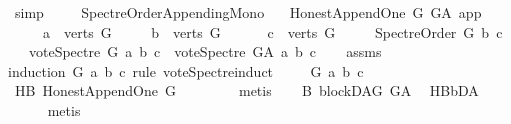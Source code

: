 \begin{isabellebody}
\ simp\ \isanewline
\ \ \isamarkupfalse%
\isanewline
{}\isamarkupfalse%
%
\endisatagproof
{\isafoldproof}%
%
\isadelimproof
\isanewline
%
\endisadelimproof
\isanewline
{}\isamarkupfalse%
\ Spectre{\isacharunderscore}{\kern0pt}Order{\isacharunderscore}{\kern0pt}Appending{\isacharunderscore}{\kern0pt}Mono{\isacharcolon}{\kern0pt}\isanewline
\ \ \ {\isachardoublequoteopen}Honest{\isacharunderscore}{\kern0pt}Append{\isacharunderscore}{\kern0pt}One\ G\ G{\isacharunderscore}{\kern0pt}A\ app{\isachardoublequoteclose}\isanewline
\ \ \ \ \ {\isachardoublequoteopen}a\ {\isasymin}\ verts\ G{\isachardoublequoteclose}\isanewline
\ \ \ \ \ {\isachardoublequoteopen}b\ {\isasymin}\ verts\ G{\isachardoublequoteclose}\ \isanewline
\ \ \ \ \ {\isachardoublequoteopen}c\ {\isasymin}\ verts\ G{\isachardoublequoteclose}\isanewline
\ \ \ \ \ {\isachardoublequoteopen}Spectre{\isacharunderscore}{\kern0pt}Order\ G\ b\ c{\isachardoublequoteclose}\isanewline
\ \ \ {\isachardoublequoteopen}vote{\isacharunderscore}{\kern0pt}Spectre\ G\ a\ b\ c\ {\isasymle}\ vote{\isacharunderscore}{\kern0pt}Spectre\ G{\isacharunderscore}{\kern0pt}A\ a\ b\ c{\isachardoublequoteclose}\isanewline
%
\isadelimproof
\ \ %
\endisadelimproof
%
\isatagproof
{}\isamarkupfalse%
\ assms\isanewline
{}\isamarkupfalse%
{\isacharparenleft}{\kern0pt}induction\ G\ a\ b\ c\ rule{\isacharcolon}{\kern0pt}\ vote{\isacharunderscore}{\kern0pt}Spectre{\isachardot}{\kern0pt}induct{\isacharparenright}{\kern0pt}\isanewline
\ \ \isamarkupfalse%
\ {\isacharparenleft}{\kern0pt}{}\ G\ a\ b\ c{\isacharparenright}{\kern0pt}\isanewline
\ \ \isamarkupfalse%
\ HB{}{\isacharcolon}{\kern0pt}\ Honest{\isacharunderscore}{\kern0pt}Append{\isacharunderscore}{\kern0pt}One\ {\isachardoublequoteopen}G{\isachardoublequoteclose}\ \isamarkupfalse%
\ {}{\isacharparenleft}{\kern0pt}{}{\isacharparenright}{\kern0pt}\isanewline
\ \ \ \ \isamarkupfalse%
\ metis\isanewline
\ \ \isamarkupfalse%
\ B{}{\isacharcolon}{\kern0pt}\ blockDAG\ {\isachardoublequoteopen}G{\isacharunderscore}{\kern0pt}A{\isachardoublequoteclose}\ \isamarkupfalse%
\ HB{}{\isachardot}{\kern0pt}bD{\isacharunderscore}{\kern0pt}A\ \isanewline
\ \ \ \ \isamarkupfalse%
\ metis\isanewline
\ \ \isamarkupfalse%

\end{isabellebody}
